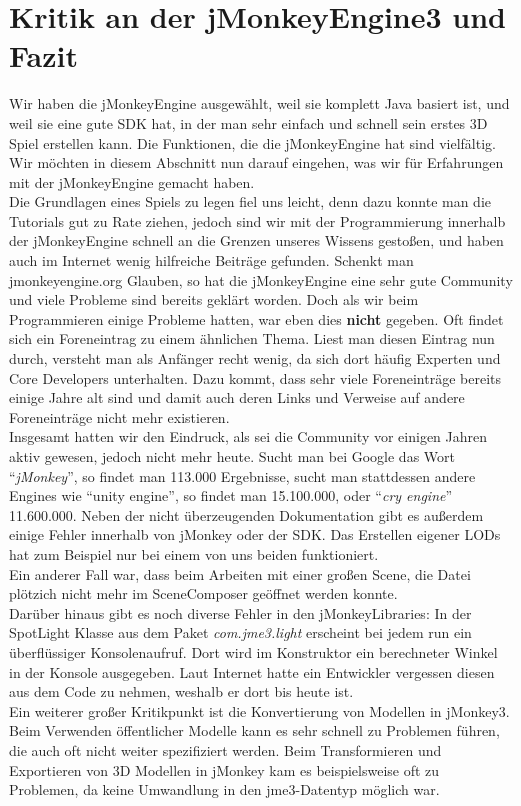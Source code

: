 \section{Kritik an der jMonkeyEngine3 und Fazit}
Wir haben die jMonkeyEngine ausgewählt, weil sie komplett Java basiert ist, und weil sie eine gute SDK hat, in der man sehr einfach und schnell sein erstes 3D Spiel erstellen kann. Die Funktionen, die die jMonkeyEngine hat sind vielfältig. Wir möchten in diesem Abschnitt nun darauf eingehen, was wir für Erfahrungen mit der jMonkeyEngine gemacht haben. \\
Die Grundlagen eines Spiels zu legen fiel uns leicht, denn dazu konnte man die Tutorials gut zu Rate ziehen, jedoch sind wir mit der Programmierung innerhalb der jMonkeyEngine schnell an die Grenzen unseres Wissens gestoßen, und haben auch im Internet wenig hilfreiche Beiträge gefunden. Schenkt man jmonkeyengine.org Glauben, so hat die jMonkeyEngine eine sehr gute Community und viele Probleme sind bereits geklärt worden. Doch als wir beim Programmieren einige Probleme hatten, war eben dies \textbf{nicht} gegeben. Oft findet sich ein Foreneintrag zu einem ähnlichen Thema. Liest man diesen Eintrag nun durch, versteht man als Anfänger recht wenig, da sich dort häufig Experten und Core Developers unterhalten. Dazu kommt, dass sehr viele Foreneinträge bereits einige Jahre alt sind und damit auch deren Links und Verweise auf andere Foreneinträge nicht mehr existieren. \\
Insgesamt hatten wir den Eindruck, als sei die Community vor einigen Jahren aktiv gewesen, jedoch nicht mehr heute. Sucht man bei Google das Wort \enquote{\emph{jMonkey}}, so findet man 113.000 Ergebnisse, sucht man stattdessen andere Engines wie \enquote{unity engine}, so findet man 15.100.000, oder \enquote{\emph{cry engine}} 11.600.000. Neben der nicht überzeugenden Dokumentation gibt es außerdem einige Fehler innerhalb von jMonkey oder der SDK. Das Erstellen eigener LODs hat zum Beispiel nur bei einem von uns beiden funktioniert. \\
Ein anderer Fall war, dass beim Arbeiten mit einer großen Scene, die Datei plötzich nicht mehr im SceneComposer geöffnet werden konnte. \\
Darüber hinaus gibt es noch diverse Fehler in den jMonkeyLibraries: In der SpotLight Klasse aus dem Paket \emph{com.jme3.light} erscheint bei jedem run ein überflüssiger Konsolenaufruf. Dort wird im Konstruktor ein berechneter Winkel in der Konsole ausgegeben. Laut Internet hatte ein Entwickler vergessen diesen aus dem Code zu nehmen, weshalb er dort bis heute ist. \\
Ein weiterer großer Kritikpunkt ist die Konvertierung von Modellen in jMonkey3.
Beim Verwenden öffentlicher Modelle kann es sehr schnell zu Problemen führen, die auch oft nicht weiter spezifiziert werden. Beim Transformieren und Exportieren von 3D Modellen in jMonkey kam es beispielsweise oft zu Problemen, da keine Umwandlung in den jme3-Datentyp möglich war. 

